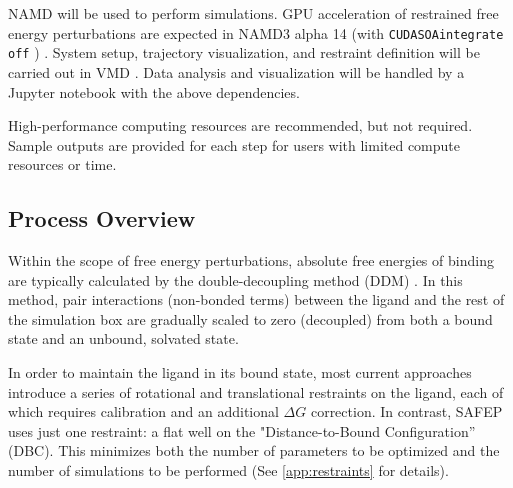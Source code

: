 \documentclass[9pt,tutorial]{Styling/livecoms}
\newcommand{\textInput}[1]{
  \texttt{#1}
}
\begin{document}
NAMD will be used to perform simulations. GPU acceleration of restrained free energy perturbations are expected in NAMD3 alpha 14 (with \textInput{CUDASOAintegrate off}) \cite{Chen2020, Phillips2020}. System setup, trajectory visualization, and restraint definition will be carried out in VMD \cite{Humphrey1996}. Data analysis and visualization will be handled by a Jupyter notebook with the above dependencies.

High-performance computing resources are recommended, but not required. Sample outputs are provided for each step for users with limited compute resources or time.

\subsection{Process Overview} \label{sec:processOverview}

Within the scope of free energy perturbations, absolute free energies of binding are typically calculated by the double-decoupling method (DDM) \cite{Gilson1997, Hamelberg2004, Woo2005}. 
In this method, pair interactions (non-bonded terms) between the ligand and the rest of the simulation box are gradually scaled to zero (decoupled) from both a bound state and an unbound, solvated state.

In order to maintain the ligand in its bound state, most current approaches introduce a series of rotational and translational restraints on the ligand, each of which requires calibration and an additional $\Delta G$ correction.
In contrast, SAFEP uses just one restraint: a flat well on the "Distance-to-Bound Configuration'' (DBC). This minimizes both the number of parameters to be optimized and the number of simulations to be performed (See \ref{app:restraints} for details).
\end{document}
